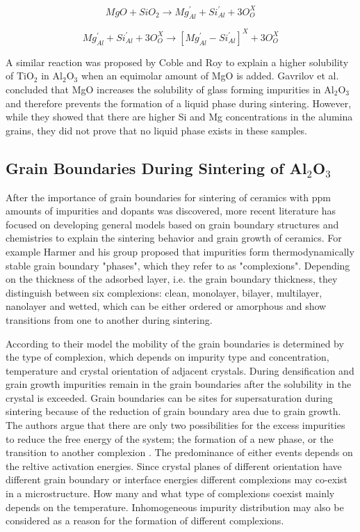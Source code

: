 \begin{equation}
\label{Ch1-eq: eq1}
MgO + SiO_{2} \rightarrow Mg_{Al}^{'} + Si_{Al}^{'} + 3O_{O}^{X}
\end{equation}

\begin{equation}
\label{Ch1-eq: eq2}
Mg_{Al}^{'} + Si_{Al}^{'} + 3O_{O}^{X} \rightarrow \left[ Mg_{Al}^{'} - Si_{Al}^{'} \right]^{X} + 3O_{O}^{X}
\end{equation}

\noindent A similar reaction was proposed by Coble and Roy \cite{Roy1968} to explain a higher solubility of TiO$_{2}$ in Al$_{2}$O$_{3}$ when an equimolar amount of MgO is added. Gavrilov et al. \cite{Gavrilov1999} concluded that MgO increases the solubility of glass forming impurities in Al$_{2}$O$_{3}$ and therefore prevents the formation of a liquid phase during sintering. However, while they showed that there are higher Si and Mg concentrations in the alumina grains, they did not prove that no liquid phase exists in these samples. 

\subsection{Grain Boundaries During Sintering of Al$_{2}$O$_{3}$}
After the importance of grain boundaries for sintering of ceramics with ppm amounts of impurities and dopants was discovered, more recent literature has focused on developing general models based on grain boundary structures and chemistries to explain the sintering behavior and grain growth of ceramics. For example Harmer and his group \cite{Dillon2007a,Dillon2010,Dillon2007,Cantwell2014} proposed that impurities form thermodynamically stable grain boundary "phases", which they refer to as "complexions". Depending on the thickness of the adsorbed layer, i.e. the grain boundary thickness, they distinguish between six complexions: clean, monolayer, bilayer, multilayer, nanolayer and wetted, which can be either ordered or amorphous and show transitions from one to another during sintering. 

According to their model the mobility of the grain boundaries is determined by the type of complexion, which depends on impurity type and concentration, temperature and crystal orientation of adjacent crystals. During densification and grain growth impurities remain in the grain boundaries after the solubility in the crystal is exceeded. Grain boundaries can be sites for supersaturation during sintering because of the reduction of grain boundary area due to grain growth. The authors argue that there are only two possibilities for the excess impurities to reduce the free energy of the system; the formation of a new phase, or the transition to another complexion \cite{Dillon2010}. The predominance of either events depends on the reltive activation energies. Since crystal planes of different orientation have different grain boundary or interface energies different complexions may co-exist in a microstructure. How many and what type of complexions coexist mainly depends on the temperature. Inhomogeneous impurity distribution may also be considered as a reason for the formation of different complexions. 

